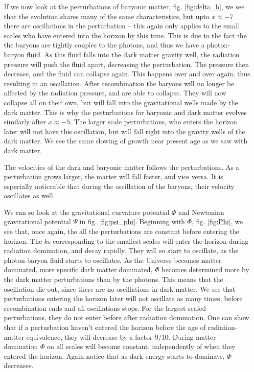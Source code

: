 \documentclass[a4paper,norsk, 10pt]{article}
\begin{document}
If we now look at the perturbations of baryonic matter, fig. \ref{fig:delta_b}, we see that the evolution shares many of the same characteristics, but upto $x \approx -7$ there are oscillations in the perturbation -- this again only applies to the small scales who have entered into the horizon by this time. This is due to the fact the the baryons are tightly couples to the photons, and thus we have a photon-baryon fluid. As this fluid falls into the dark matter gravity well, the radiation pressure will push the fluid apart, decreasing the perturbation. The pressure then decrease, and the fluid can collapse again. This happens over and over again, thus resulting in an oscillation. After recombination the baryons will no longer be affected by the radiation pressure, and are able to collapse. They will now collapse all on their own, but will fall into the gravitational wells made by the dark matter. This is why the perturbations for baryonic and dark matter evolves similarly after $x\approx -5$. The larger scale perturbations, who enters the horizon later will not have this oscillation, but will fall right into the gravity wells of the dark matter. We see the same slowing of growth near present age as we saw with dark matter.

The velocities of the dark and baryonic matter follows the perturbations. As a perturbation grows larger, the matter will fall faster, and vice versa. It is especially noticeable that during the oscillation of the baryons, their velocity oscillates as well. 

We can so look at the gravitational curvature potential $\Phi$ and Newtonian gravitational potential $\Psi$ in fig. \ref{fig:psi_phi}. Beginning with $\Phi$, fig. \ref{fig:Phi}, we see that, once again, the all the perturbations are constant before entering the horizon. The $k$s corresponding to the smallest scales will enter the horizon during radiation domination, and decay rapidly. They will so start to oscillate, as the photon-baryon fluid starts to oscillates. As the Universe becomes matter dominated, more specific dark matter dominated, $\Phi$ becomes determined more by the dark matter perturbations than by the photons. This means that the oscillation die out, since there are no oscillations in dark matter. We see that perturbations entering the horizon later will not oscillate as many times, before recombination ends and all oscillations stops. For the largest scaled perturbations, they do not enter before after radiation domination. One can show that if a perturbation haven't entered the horizon before the age of radiation-matter equivalence, they will decrease by a factor $9/10$. During matter domination $\Phi$ on all scales will become constant, independently of when they entered the horizon. Again notice that as dark energy starts to dominate, $\Phi$ decreases.
\end{document}
